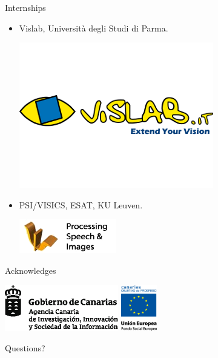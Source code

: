 \begin{frame}{Internships}
\begin{itemize}
 \item Vislab, Università degli Studi di Parma.
 \begin{center}
  \includegraphics[height=0.1\textheight,trim=0 20 0 20,clip]{vislab_logo}
 \end{center}
 \item PSI/VISICS, ESAT, KU Leuven.
 \begin{center}
  \includegraphics[height=0.2\textheight]{psi}
 \end{center}

\end{itemize}

\end{frame}

\begin{frame}{Acknowledges}
 \begin{center}
\includegraphics[height=2cm]{aciisi_negro}
\hskip 1cm
\includegraphics[height=2cm]{fondo_social_europeo_cop_ue}
 \end{center}

\end{frame}

{
\begin{frame}[plain]{Questions?}

\end{frame}
}

